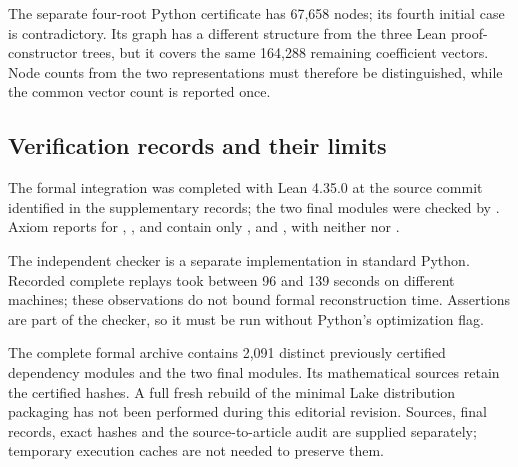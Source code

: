 \documentclass[pdflatex,sn-mathphys-num]{sn-jnl}
\begin{document}
The separate four-root Python certificate has 67,658 nodes; its fourth initial case is contradictory. Its graph has a different structure from the three Lean proof-constructor trees, but it covers the same 164,288 remaining coefficient vectors. Node counts from the two representations must therefore be distinguished, while the common vector count is reported once.

\subsection{Verification records and their limits}\label{subsec:C:3}

The formal integration was completed with Lean 4.35.0 at the source commit identified in the supplementary records; the two final modules were checked by . Axiom reports for , ,  and  contain only ,  and , with neither  nor .

The independent checker is a separate implementation in standard Python. Recorded complete replays took between 96 and 139 seconds on different machines; these observations do not bound formal reconstruction time. Assertions are part of the checker, so it must be run without Python's optimization flag.

The complete formal archive contains 2,091 distinct previously certified dependency modules and the two final modules. Its mathematical sources retain the certified hashes. A full fresh rebuild of the minimal Lake distribution packaging has not been performed during this editorial revision. Sources, final records, exact hashes and the source-to-article audit are supplied separately; temporary execution caches are not needed to preserve them.
\end{document}
